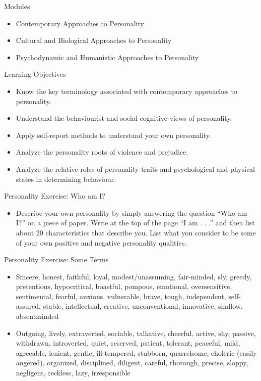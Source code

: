 \documentclass[
]{book}
\providecommand{\tightlist}{%
  \setlength{\itemsep}{0pt}\setlength{\parskip}{0pt}}
\begin{document}
\begin{reflect}
Modules

\begin{itemize}
\tightlist
\item
  Contemporary Approaches to Personality\\
\item
  Cultural and Biological Approaches to Personality\\
\item
  Psychodynamic and Humanistic Approaches to Personality
\end{itemize}

Learning Objectives

\begin{itemize}
\tightlist
\item
  Know the key terminology associated with contemporary approaches to personality.\\
\item
  Understand the behaviourist and social-cognitive views of personality.\\
\item
  Apply self-report methods to understand your own personality.\\
\item
  Analyze the personality roots of violence and prejudice.\\
\item
  Analyze the relative roles of personality traits and psychological and physical states in determining behaviour.
\end{itemize}

Personality Exercise: Who am I?

\begin{itemize}
\tightlist
\item
  Describe your own personality by simply answering the question ``Who am I?'' on a piece of paper. Write at the top of the page ``I am . . .'' and then list about 20 characteristics that describe you. List what you consider to be some of your own positive and negative personality qualities.
\end{itemize}

Personality Exercise: Some Terms

\begin{itemize}
\tightlist
\item
  Sincere, honest, faithful, loyal, modest/unassuming, fair-minded, sly, greedy, pretentious, hypocritical, boastful, pompous, emotional, oversensitive, sentimental, fearful, anxious, vulnerable, brave, tough, independent, self-assured, stable, intellectual, creative, unconventional, innovative, shallow, absentminded\\
\item
  Outgoing, lively, extraverted, sociable, talkative, cheerful, active, shy, passive, withdrawn, introverted, quiet, reserved, patient, tolerant, peaceful, mild, agreeable, lenient, gentle, ill-tempered, stubborn, quarrelsome, choleric (easily angered), organized, disciplined, diligent, careful, thorough, precise, sloppy, negligent, reckless, lazy, irresponsible
\end{itemize}


\end{reflect}
\end{document}
